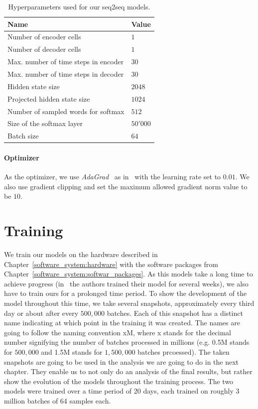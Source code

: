 \begin{table}[H]
	\centering
	\begin{adjustbox}{max width=\textwidth}
		\begin{tabular}{ll}
			\toprule
			Name & Value\\ \midrule
			Number of encoder cells & $1$\\
			Number of decoder cells & $1$\\
			Max. number of time steps in encoder & $30$\\
			Max. number of time steps in decoder & $30$\\
			Hidden state size & $2048$\\
			Projected hidden state size & $1024$\\
			Number of sampled words for softmax & $512$\\
			Size of the softmax layer & $50'000$\\
			Batch size & $64$\\
			\bottomrule
		\end{tabular}
	\end{adjustbox}
	\caption{Hyperparameters used for our seq2seq models.}
	\label{methods:hyperparameters:table}
\end{table}

\paragraph{Optimizer} As the optimizer, we use \emph{AdaGrad}~\cite{Duchi:2011} as in~\cite{Vinyals:2015} with the learning rate set to $0.01$. We also use gradient clipping \cite{Pascanu:2013} and set the maximum allowed gradient norm value to be $10$.

\section{Training}
\label{methods:training}
We train our models on the hardware described in Chapter~\ref{software_system:hardware} with the software packages from Chapter~\ref{software_system:softwar_packages}. As this models take a long time to achieve progress (in~\cite{Vinyals:2015} the authors trained their model for several weeks), we also have to train ours for a prolonged time period. To show the development of the model throughout this time, we take several snapshots, approximately every third day or about after every $500,000$ batches. Each of this snapshot has a distinct name indicating at which point in the training it was created. The names are going to follow the naming convention xM, where x stands for the decimal number signifying the number of batches processed in millions (e.g. 0.5M stands for $500,000$ and 1.5M stands for $1,500,000$ batches prcoessed). The taken snapshots are going to be used in the analysis we are going to do in the next chapter. They enable us to not only do an analysis of the final results, but rather show the evolution of the models throughout the training process. The two models were trained over a time period of 20 days, each trained on roughly 3 million batches of 64 samples each.

